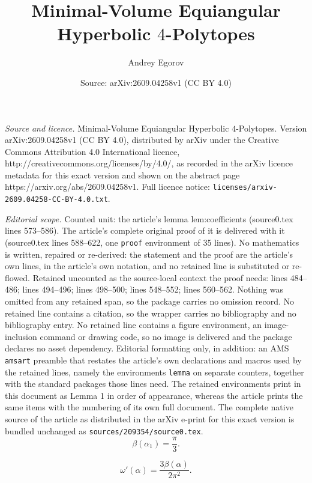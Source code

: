 \documentclass[10pt,a4paper]{amsart}
\title{Minimal-Volume Equiangular Hyperbolic $4$-Polytopes}
\author{Andrey Egorov}
\date{Source: arXiv:2609.04258v1 (CC BY 4.0)}
\begin{document}
\maketitle

\noindent\emph{Source and licence.} Minimal-Volume Equiangular Hyperbolic $4$-Polytopes. Version arXiv:2609.04258v1 (CC BY 4.0), distributed by arXiv under the Creative Commons Attribution 4.0 International licence, http://creativecommons.org/licenses/by/4.0/, as recorded in the arXiv licence metadata for this exact version and shown on the abstract page https://arxiv.org/abs/2609.04258v1. Full licence notice: \texttt{licenses/arxiv-2609.04258-CC-BY-4.0.txt}.\par\smallskip

\noindent\textit{Editorial scope.} Counted unit: the article's lemma lem:coefficients (source0.tex lines 573--586). The article's complete original proof of it is delivered with it (source0.tex lines 588--622, one \texttt{proof} environment of 35 lines). No mathematics is written, repaired or re-derived: the statement and the proof are the article's own lines, in the article's own notation, and no retained line is substituted or re-flowed.  Retained uncounted as the source-local context the proof needs: lines 484--486; lines 494--496; lines 498--500; lines 548--552; lines 560--562.  Nothing was omitted from any retained span, so the package carries no omission record.  No retained line contains a citation, so the wrapper carries no bibliography and no bibliography entry.  No retained line contains a figure environment, an image-inclusion command or drawing code, so no image is delivered and the package declares no asset dependency.  Editorial formatting only, in addition: an AMS \texttt{amsart} preamble that restates the article's own declarations and macros used by the retained lines, namely the environments \texttt{lemma} on separate counters, together with the standard packages those lines need.  The retained environments print in this document as Lemma 1 in order of appearance, whereas the article prints the same items with the numbering of its own full document.  The complete native source of the article as distributed in the arXiv e-print for this exact version is bundled unchanged as \texttt{sources/209354/source0.tex}.
\begin{equation}\label{eq:beta-alpha1}
 \beta(\alpha_1)=\frac{\pi}{3}.
\end{equation}

\begin{equation}\label{eq:omega-derivative}
 \omega'(\alpha)=\frac{3\beta(\alpha)}{2\pi^2}.
\end{equation}
\end{document}
